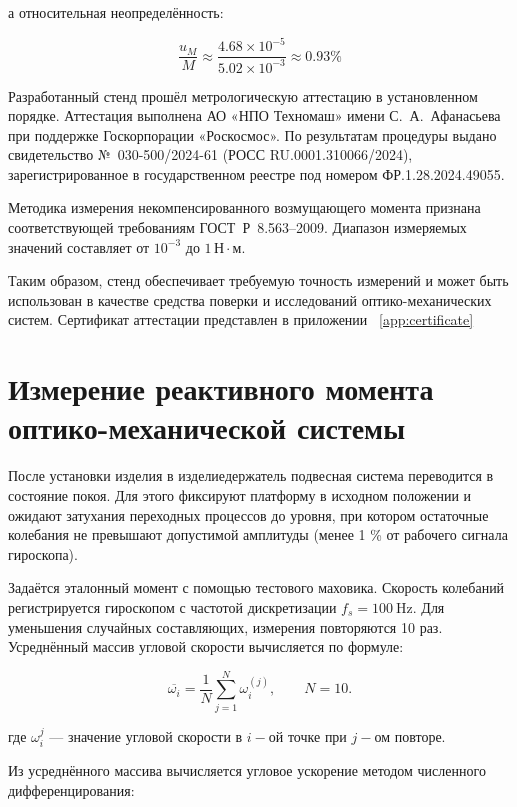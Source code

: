 а относительная неопределённость:

\begin{equation}
	\frac{u_{M}}{M} \approx 
	\frac{4.68 \times 10^{-5}}{5.02 \times 10^{-3}}
	\approx 0.93\% 
\end{equation}

Разработанный стенд прошёл метрологическую аттестацию в установленном порядке. 
Аттестация выполнена АО «НПО Техномаш» имени С.~А.~Афанасьева при поддержке 
Госкорпорации «Роскосмос». По результатам процедуры выдано свидетельство 
№~030-500/2024-61 (РОСС RU.0001.310066/2024), зарегистрированное в государственном 
реестре под номером ФР.1.28.2024.49055.

Методика измерения некомпенсированного возмущающего момента признана 
соответствующей требованиям ГОСТ~Р~8.563--2009. Диапазон измеряемых значений 
составляет от $10^{-3}$ до $1 \,\text{Н}\cdot\text{м}$.  

Таким образом, стенд обеспечивает требуемую точность измерений 
и может быть использован в качестве средства поверки и исследований 
оптико-механических систем. Сертификат аттестации представлен в приложении ~\cref{app:certificate}

	
\section{Измерение реактивного момента оптико-механической системы}

После установки изделия в изделиедержатель подвесная система переводится в состояние покоя. Для этого фиксируют платформу в исходном положении и ожидают затухания переходных процессов до уровня, при котором остаточные колебания не превышают допустимой амплитуды (менее 1 \% от рабочего сигнала гироскопа).

Задаётся эталонный момент с помощью тестового маховика. Скорость колебаний регистрируется гироскопом с частотой дискретизации $f_s=\SI{100}{\hertz}$. Для уменьшения случайных составляющих, измерения повторяются 10 раз. Усреднённый массив угловой скорости вычисляется по формуле:

\begin{equation}
	\label{eq:mean_spd}
	\overline{\omega_{i}}=\frac{1}{N}\sum_{j=1}^{N}\omega_{i}^{(j)}, \qquad N = 10.
\end{equation}

где \(\omega_{i}^j\) --- значение угловой скорости в $i-$ой точке при $j-$ом повторе.

Из усреднённого массива вычисляется угловое ускорение методом численного дифференцирования:

